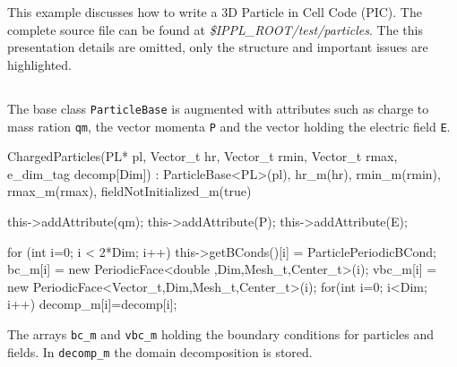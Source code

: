 

 \section{}
 This example discusses how to write a 3D Particle in Cell Code (PIC). The
 complete source file can be found at {\em \$IPPL\_ROOT/test/particles}. The
 this presentation details are omitted, only the structure and important issues are
 highlighted.
 \subsection{}
 The base class {\tt ParticleBase} is augmented with attributes such as charge to mass ration
 {\tt qm}, the vector momenta {\tt P} and the vector holding the electric field {\tt E}.
 \begin{code}
 ChargedParticles(PL* pl, Vector_t hr, Vector_t rmin,
                  Vector_t rmax, e_dim_tag decomp[Dim]) :
                  ParticleBase<PL>(pl),
                  hr_m(hr),
                  rmin_m(rmin),
                  rmax_m(rmax),
                  fieldNotInitialized_m(true)
{
    this->addAttribute(qm);
    this->addAttribute(P);
    this->addAttribute(E);

    for (int i=0; i < 2*Dim; i++) {
        this->getBConds()[i] = ParticlePeriodicBCond;
        bc_m[i]  = new PeriodicFace<double  ,Dim,Mesh_t,Center_t>(i);
        vbc_m[i] = new PeriodicFace<Vector_t,Dim,Mesh_t,Center_t>(i);
    }
    for(int i=0; i<Dim; i++)
        decomp_m[i]=decomp[i];
}
\end{code}
The arrays {\tt bc\_m} and {\tt vbc\_m} holding the boundary conditions for particles and fields.
In {\tt decomp\_m} the domain decomposition is stored.

\subsection{}

